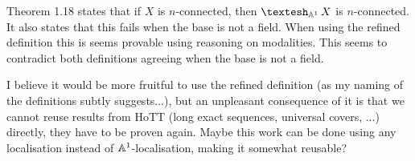 \begin{remark}
Theorem 1.18 states that if $X$ is $n$-connected, then $\shape_{\A^1}X$ is $n$-connected. It also states that this fails when the base is not a field. When using the refined definition this is seems provable using reasoning on modalities. This seems to contradict both definitions agreeing when the base is not a field.
\end{remark}

I believe it would be more fruitful to use the refined definition (as my naming of the definitions subtly suggests...), but an unpleasant consequence of it is that we cannot reuse results from HoTT (long exact sequences, universal covers, ...) directly, they have to be proven again. Maybe this work can be done using any localisation instead of $\mathbb{A}^1$-localisation, making it somewhat reusable?

